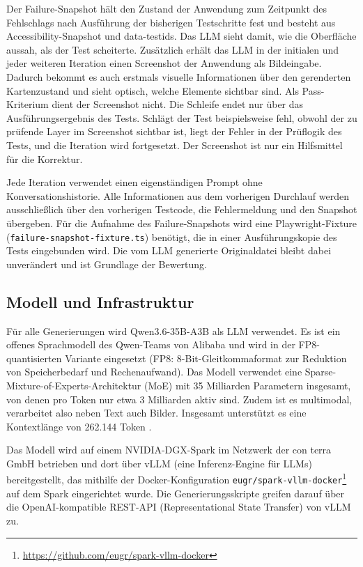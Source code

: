 Der Failure-Snapshot hält den Zustand der Anwendung zum Zeitpunkt des Fehlschlags nach Ausführung der bisherigen Testschritte fest und besteht aus Accessibility-Snapshot und data-testids. Das \ac{LLM} sieht damit, wie die Oberfläche aussah, als der Test scheiterte. Zusätzlich erhält das \ac{LLM} in der initialen und jeder weiteren Iteration einen Screenshot der Anwendung als Bildeingabe. Dadurch bekommt es auch erstmals visuelle Informationen über den gerenderten Kartenzustand und sieht optisch, welche Elemente sichtbar sind. Als Pass-Kriterium dient der Screenshot nicht. Die Schleife endet nur über das Ausführungsergebnis des Tests. Schlägt der Test beispielsweise fehl, obwohl der zu prüfende Layer im Screenshot sichtbar ist, liegt der Fehler in der Prüflogik des Tests, und die Iteration wird fortgesetzt. Der Screenshot ist nur ein Hilfsmittel für die Korrektur.

Jede Iteration verwendet einen eigenständigen Prompt ohne Konversationshistorie. Alle Informationen aus dem vorherigen Durchlauf werden ausschließlich über den vorherigen Testcode, die Fehlermeldung und den Snapshot übergeben. Für die Aufnahme des Failure-Snapshots wird eine Playwright-Fixture (\texttt{failure-snapshot-fixture.ts}) benötigt, die in einer Ausführungskopie des Tests eingebunden wird. Die vom \ac{LLM} generierte Originaldatei bleibt dabei unverändert und ist Grundlage der Bewertung.

\subsection{Modell und Infrastruktur}

Für alle Generierungen wird Qwen3.6-35B-A3B als \ac{LLM} verwendet. Es ist ein offenes Sprachmodell des Qwen-Teams von Alibaba und wird in der FP8-quantisierten Variante eingesetzt (FP8: 8-Bit-Gleitkommaformat zur Reduktion von Speicherbedarf und Rechenaufwand). Das Modell verwendet eine Sparse-Mixture-of-Experts-Architektur (MoE) mit 35 Milliarden Parametern insgesamt, von denen pro Token nur etwa 3 Milliarden aktiv sind. Zudem ist es multimodal, verarbeitet also neben Text auch Bilder. Insgesamt unterstützt es eine Kontextlänge von 262.144 Token \parencite{hugging_face_qwenqwen36-35b-a3b-fp8_2026, qwen_team_alibaba_qwen36-35b-a3b_2026}.

Das Modell wird auf einem NVIDIA-DGX-Spark im Netzwerk der con terra GmbH betrieben und dort über vLLM (eine Inferenz-Engine für \acp{LLM}) bereitgestellt, das mithilfe der Docker-Konfiguration \texttt{eugr/spark-vllm-docker}\footnote{\url{https://github.com/eugr/spark-vllm-docker}} auf dem Spark eingerichtet wurde. Die Generierungsskripte greifen darauf über die OpenAI-kompatible REST-API (Representational State Transfer) von vLLM zu.

